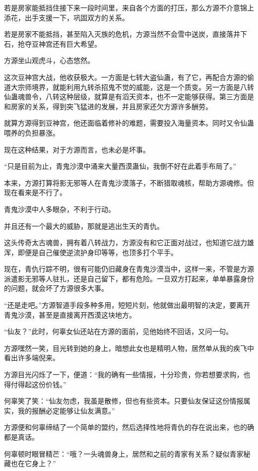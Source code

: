 \begin{this_body}
若是房家能抵挡住接下来一段时间里，来自各个方面的打压，那么方源不介意锦上添花，出手支援一下，巩固双方的关系。

若是房家不能抵挡，甚至陷入灭族的危机，方源当然不会雪中送炭，直接落井下石，抢夺豆神宫还有巨大希望。

方源坐山观虎斗，心态悠然。

这次豆神宫大战，他收获极大。一方面是七转大盗仙蛊，有了它，再配合方源的偷道大宗师境界，就能利用九转杀招鬼不觉的威能，这是一个质变。另一方面是八转仙蛊魂兽令，八转这种层级，就算是有滔天资本，也不一定能够获得。第三方面是和房家的关系，得到突飞猛进的发展，并且房家还欠方源许多酬劳。

就算方源得到豆神宫，他还面临着修补的难题，需要投入海量资本。同时又令仙蛊喂养的负担暴涨。

现在这种结果，对于方源而言，也未必是坏事。

“只是目前为止，青鬼沙漠中涌来大量西漠蛊仙，我倒不好在此着手布局了。”

本来，方源打算将影无邪等人在青鬼沙漠落子，不断猎取魂核，帮助方源魂修。但现在看来是不行了。

青鬼沙漠中人多眼杂，不利于行动。

并且还有一个最大的威胁，那就是逃出生天的青仇。

这头传奇太古魂兽，拥有着八转战力，方源没有和它正面对战过，也知道它战力雄浑，即便是自己催使逆流护身印等等，也顶多打个平手。

现在，青仇行踪不明，很有可能仍旧藏身在青鬼沙漠当中，这样一来，不管是方源派遣影无邪等人驻扎，还是自己留下，都有危险。一旦双方打起来，单单暴露身份的问题，就会坏了方源很多大事。

“还是走吧。”方源智道手段多种多用，短短片刻，他就做出最明智的决定，要离开青鬼沙漠，甚至是直接离开西漠这块地方。

“仙友？”此时，何辜女仙还站在方源的面前，见他始终不回话，又问一句。

方源嘿然一笑，目光转到她的身上，暗想此女也是精明人物，居然单从我的疾飞中看出许多端倪来。

方源目光闪烁了一下，便道：“我的确有一些情报，十分珍贵，你若想要求购，也得付得起这份价钱。”

何辜笑了笑：“仙友勿虑，我虽是散修，但也有些资本。只要仙友保证这份情报属实，我的报酬必定能够让仙友满意。”

方源便和何辜缔结了一个简单的盟约，然后选择性地将青仇的存在说出来，也的确都是真话。

何辜顿时眼冒精芒：“哦？一头魂兽身上，居然和之前的青家有关系？疑似青家秘藏也在它身上？”


\end{this_body}
